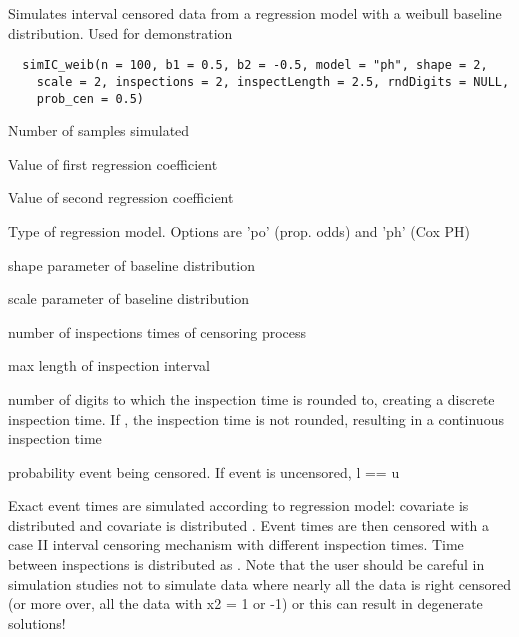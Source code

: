 \documentclass[a4paper]{book}
\begin{document}
%
\begin{Description}\relax
Simulates interval censored data from a regression model with a weibull baseline distribution. Used for demonstration

\end{Description}
%
\begin{Usage}
\begin{verbatim}
  simIC_weib(n = 100, b1 = 0.5, b2 = -0.5, model = "ph", shape = 2, 
    scale = 2, inspections = 2, inspectLength = 2.5, rndDigits = NULL,
    prob_cen = 0.5)
\end{verbatim}
\end{Usage}
%
\begin{Arguments}
\begin{ldescription}
\item[\code{n}] Number of samples simulated
\item[\code{b1}] Value of first regression coefficient
\item[\code{b2}] Value of second regression coefficient
\item[\code{model}] Type of regression model. Options are 'po' (prop. odds) and 'ph' (Cox PH)
\item[\code{shape}] shape parameter of baseline distribution
\item[\code{scale}] scale parameter of baseline distribution
\item[\code{inspections}] number of inspections times of censoring process
\item[\code{inspectLength}] max length of inspection interval
\item[\code{rndDigits}] number of digits to which the inspection time is rounded to, creating a discrete inspection time. If , the inspection time is not rounded, resulting in a continuous inspection time
\item[\code{prob\_cen}] probability event being censored. If event is uncensored, l == u
\end{ldescription}
\end{Arguments}
%
\begin{Details}\relax
Exact event times are simulated according to regression model: covariate  is distributed  and covariate  is distributed . Event times are then censored with a case II interval censoring mechanism with  different inspection times. Time between inspections is distributed as . Note that the user should be careful in simulation studies not to simulate data where nearly all the data is right censored (or more over, all the data with x2 = 1 or -1) or this can result in degenerate solutions!
\end{Details}
\end{document}
